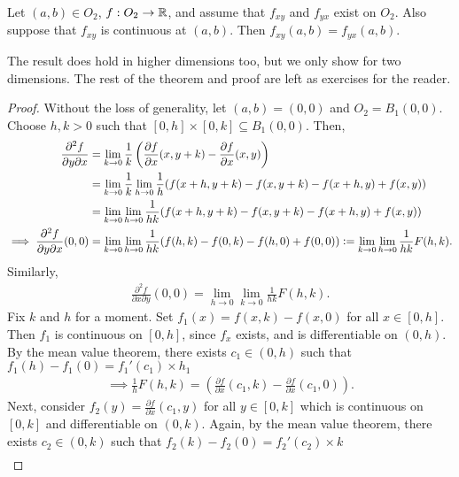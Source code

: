 \begin{theorem}
    Let $(a,b) \in O_{2}$, $f:O_{2} \to \mathbb{R}$, and assume that $f_{xy}$ and $f_{yx}$ exist on $O_{2}$. Also suppose that $f_{xy}$ is continuous at $(a,b)$. Then $f_{xy}(a,b) = f_{yx}(a,b)$.
\end{theorem}
The result does hold in higher dimensions too, but we only show for two dimensions. The rest of the theorem and proof are left as exercises for the reader.
\begin{proof}
    Without the loss of generality, let $(a,b) = (0,0)$ and $O_{2} = B_{1}(0,0)$. Choose $h,k > 0$ such that $[0,h] \times [0,k] \subseteq B_{1}(0,0)$. Then,
    \begin{align}
        \frac{\partial^{2}f}{\partial y \partial x} &= \lim_{k \to 0} \frac{1}{k} \left( \frac{\partial f}{\partial x}(x,y+k) - \frac{\partial f}{\partial x} (x,y) \right) \\
        &= \lim_{k \to 0} \frac{1}{k} \lim_{h \to 0} \frac{1}{h} (f(x+h,y+k) - f(x,y+k) - f(x+h,y) + f(x,y)) \notag\\
        &= \lim_{k \to 0} \lim_{h \to 0} \frac{1}{hk} (f(x+h,y+k) - f(x,y+k) - f(x+h,y) + f(x,y)) \\
        \implies \frac{\partial^{2}f}{\partial y \partial x}(0,0) &= \lim_{k \to 0} \lim_{h \to 0} \frac{1}{hk} (f(h,k) - f(0,k) - f(h,0) + f(0,0)) \vcentcolon= \lim_{k \to 0} \lim_{h \to 0} \frac{1}{hk}F(h,k).
    \end{align}
    Similarly,
    \begin{align}
        \frac{\partial^{2}f}{\partial x \partial y}(0,0) = \lim_{h \to 0} \lim_{k \to 0} \frac{1}{hk}F(h,k).
    \end{align}
    Fix $k$ and $h$ for a moment. Set $f_{1}(x) = f(x,k) - f(x,0)$ for all $x \in [0,h]$. Then $f_{1}$ is continuous on $[0,h]$, since $f_{x}$ exists, and is differentiable on $(0,h)$. By the mean value theorem, there exists $c_{1} \in (0,h)$ such that $f_{1}(h) - f_{1}(0) = f_{1}'(c_{1}) \times h_{1}$
    \begin{align}
        \implies \frac{1}{h}F(h,k) = \left( \frac{\partial f}{\partial x}(c_{1},k) - \frac{\partial f}{\partial x}(c_{1},0) \right).
    \end{align}
    Next, consider $f_{2}(y) = \frac{\partial f}{\partial x} (c_{1},y)$ for all $y \in [0,k]$ which is continuous on $[0,k]$ and differentiable on $(0,k)$. Again, by the mean value theorem, there exists $c_{2} \in (0,k)$ such that $f_{2}(k) - f_{2}(0) = f_{2}'(c_{2}) \times k$
    \begin{align}

\end{align}
\end{proof}
